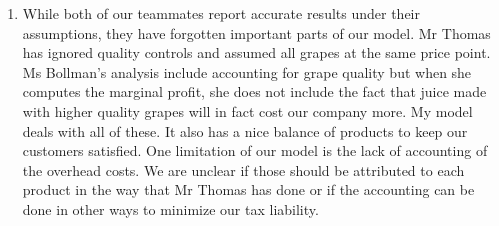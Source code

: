 \documentclass[11pt]{article}
\begin{document}
\begin{enumerate}
\begin{enumerate}
\begin{enumerate}
\item While both of our teammates report accurate results under their assumptions, they have forgotten important parts of our model.  Mr Thomas has ignored quality controls and assumed all grapes at the same price point.  Ms Bollman's analysis include accounting for grape quality but when she computes the marginal profit, she does not include the fact that juice made with higher quality grapes will in fact cost our company more.  My model deals with all of these.  It also has a nice balance of products to keep our customers satisfied.  One limitation of our model is the lack of accounting of the overhead costs.  We are unclear if those should be attributed to each product in the way that Mr Thomas has done or if the accounting can be done in other ways to minimize our tax liability.
\end{enumerate}
\end{enumerate}
\end{enumerate}
\end{document}
